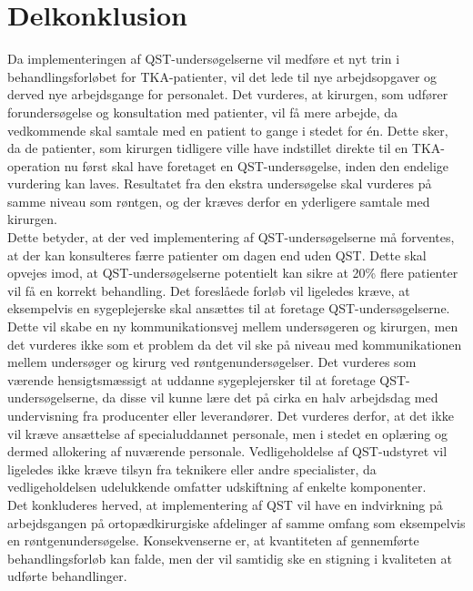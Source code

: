 \section{Delkonklusion}
Da implementeringen af QST-undersøgelserne vil medføre et nyt trin i behandlingsforløbet for TKA-patienter, vil det lede til nye arbejdsopgaver og derved nye arbejdsgange for personalet. Det vurderes, at kirurgen, som udfører forundersøgelse og konsultation med patienter, vil få mere arbejde, da vedkommende skal samtale med en patient to gange i stedet for én. Dette sker, da de patienter, som kirurgen tidligere ville have indstillet direkte til en TKA-operation nu først skal have foretaget en QST-undersøgelse, inden den endelige vurdering kan laves. Resultatet fra den ekstra undersøgelse skal vurderes på samme niveau som røntgen, og der kræves derfor en yderligere samtale med kirurgen. \\
Dette betyder, at der ved implementering af QST-undersøgelserne må forventes, at der kan konsulteres færre patienter om dagen end uden QST. Dette skal opvejes imod, at QST-undersøgelserne potentielt kan sikre at 20\% flere patienter vil få en korrekt behandling. Det foreslåede forløb vil ligeledes kræve, at eksempelvis en sygeplejerske skal ansættes til at foretage QST-undersøgelserne. Dette vil skabe en ny kommunikationsvej mellem undersøgeren og kirurgen, men det vurderes ikke som et problem da det vil ske på niveau med kommunikationen mellem undersøger og kirurg ved røntgenundersøgelser. Det vurderes som værende hensigtsmæssigt at uddanne sygeplejersker til at foretage QST-undersøgelserne, da disse vil kunne lære det på cirka en halv arbejdsdag med undervisning fra producenter eller leverandører. Det vurderes derfor, at det ikke vil kræve ansættelse af specialuddannet personale, men i stedet en oplæring og dermed allokering af nuværende personale. Vedligeholdelse af QST-udstyret vil ligeledes ikke kræve tilsyn fra teknikere eller andre specialister, da vedligeholdelsen udelukkende omfatter udskiftning af enkelte komponenter. \\
Det konkluderes herved, at implementering af QST vil have en indvirkning på arbejdsgangen på ortopædkirurgiske afdelinger af samme omfang som eksempelvis en røntgenundersøgelse. Konsekvenserne er, at kvantiteten af gennemførte behandlingsforløb kan falde, men der vil samtidig ske en stigning i kvaliteten at udførte behandlinger.
